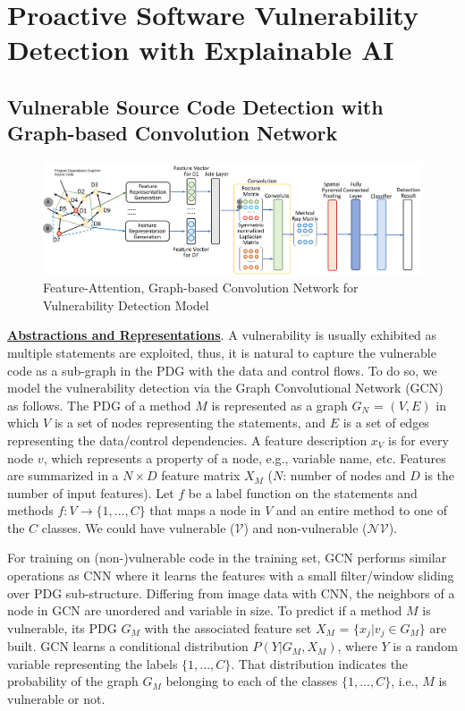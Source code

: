 \section{Proactive Software Vulnerability Detection with Explainable AI}
\label{sec:thrust1}

\subsection{Vulnerable Source Code Detection with Graph-based Convolution Network} \label{sec:vd}

\begin{figure}[!hbt]
    \centering
    \includegraphics[width=6.5in]{graph-based-CNN.png}
    \caption{Feature-Attention, Graph-based Convolution Network for
      Vulnerability Detection Model}
    \label{fig:detection-model}
\end{figure}


\noindent \underline{\bf Abstractions and Representations}. A vulnerability is usually
exhibited as multiple statements are exploited, thus, it is natural to
capture the vulnerable code as a sub-graph in the PDG with the data
and control flows. To do so, we model the vulnerability
detection via the Graph Convolutional Network (GCN)~\cite{GCN16} as
follows. The PDG of a method $M$ is represented as a graph $G_N$ =
$(V,E)$ in which $V$ is a set of nodes representing the statements,
and $E$ is a set of edges representing the data/control dependencies.
%
A feature description $x_V$ is for every node $v$, which represents a
property of a node, e.g., variable name, etc. Features are summarized
in a $N \times D$ feature matrix $X_M$ ($N$: number of nodes and $D$
is the number of input features).
%
Let $f$ be a label function on the statements and methods $f: V
\rightarrow \{1,...,C\}$ that maps a node in $V$ and an entire method
to one of the $C$ classes. We could have vulnerable
($\mathcal{V}$) and non-vulnerable ($\mathcal{NV}$).


For training on (non-)vulnerable code in the training set, GCN
performs similar operations as CNN where it learns the features with a
small filter/window sliding over PDG sub-structure. Differing from
image data with CNN, the neighbors of a node in GCN are unordered and
variable in size. To predict if a method $M$ is vulnerable, its PDG
$G_M$ with the associated feature set $X_M$ = $\{x_j|v_j \in G_M\}$
are built. GCN learns a conditional distribution $P(Y|G_M,X_M)$, where
$Y$ is a random variable representing the labels $\{1,...,C\}$. That
distribution indicates the probability of the graph $G_M$ belonging to
each of the classes $\{1,...,C\}$, i.e., $M$ is vulnerable or not.

